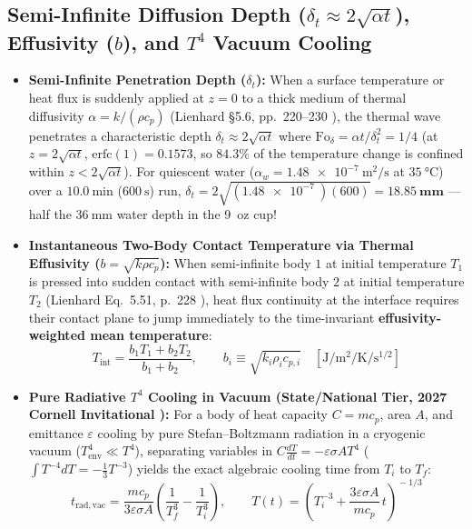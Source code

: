 \subsection{Semi-Infinite Diffusion Depth ($\delta_t \approx 2\sqrt{\alpha t}$), Effusivity ($b$), and $T^4$ Vacuum Cooling}
\begin{itemize}
  \item \textbf{Semi-Infinite Penetration Depth ($\delta_t$):} When a surface temperature or heat flux is suddenly applied at $z = 0$ to a thick medium of thermal diffusivity $\alpha = k/(\rho c_p)$ (Lienhard §5.6, pp.~220--230 ), the thermal wave penetrates a characteristic depth $\delta_t \approx 2\sqrt{\alpha t}$ where $\mathrm{Fo}_{\delta} = \alpha t / \delta_t^2 = 1/4$ (at $z = 2\sqrt{\alpha t}$, $\mathrm{erfc}(1) = 0.1573$, so $84.3\%$ of the temperature change is confined within $z < 2\sqrt{\alpha t}$). For quiescent water ($\alpha_w = \SI{1.48e-7}{\square\meter\per\second}$ at $\SI{35}{\celsius}$) over a $\SI{10.0}{\minute}$ ($\SI{600}{\second}$) run, $\delta_t = 2\sqrt{(\SI{1.48e-7}{})(600)} = \mathbf{\SI{18.85}{\milli\meter}}$ — half the $\SI{36}{\milli\meter}$ water depth in the 9~oz cup!
  \item \textbf{Instantaneous Two-Body Contact Temperature via Thermal Effusivity ($b = \sqrt{k\rho c_p}$):} When semi-infinite body $1$ at initial temperature $T_1$ is pressed into sudden contact with semi-infinite body $2$ at initial temperature $T_2$ (Lienhard Eq.~5.51, p.~228 ), heat flux continuity at the interface requires their contact plane to jump immediately to the time-invariant \textbf{effusivity-weighted mean temperature}:
  \begin{equation}
    T_{\mathrm{int}} = \frac{b_1 T_1 + b_2 T_2}{b_1 + b_2}, \qquad b_i \equiv \sqrt{k_i \rho_i c_{p,i}} \quad \left[\si{\joule\per\square\meter\per\kelvin\per\second\tothe{1/2}}\right]
    \label{eq:13:effusivity-contact}
  \end{equation}
  \item \textbf{Pure Radiative $T^4$ Cooling in Vacuum (State/National Tier, 2027 Cornell Invitational ):} For a body of heat capacity $C = m c_p$, area $A$, and emittance $\varepsilon$ cooling by pure Stefan--Boltzmann radiation in a cryogenic vacuum ($T_{\mathrm{env}}^4 \ll T^4$), separating variables in $C\frac{dT}{dt} = -\varepsilon\sigma A T^4$ ($\int T^{-4}dT = -\frac{1}{3}T^{-3}$) yields the exact algebraic cooling time from $T_i$ to $T_f$:
  \begin{equation}
    t_{\mathrm{rad,vac}} = \frac{m c_p}{3\varepsilon\sigma A}\!\left(\frac{1}{T_f^3} - \frac{1}{T_i^3}\right), \qquad T(t) = \left(T_i^{-3} + \frac{3\varepsilon\sigma A}{m c_p}\,t\right)^{\!-1/3}
    \label{eq:13:t4-vacuum}
  \end{equation}
\end{itemize}

